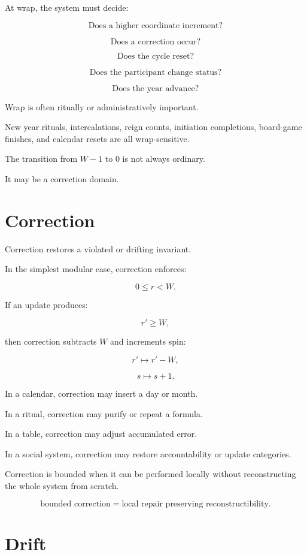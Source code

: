 \documentclass[11pt]{book}
\begin{document}
At wrap, the system must decide:

\[
\text{Does a higher coordinate increment?}
\]

\[
\text{Does a correction occur?}
\]

\[
\text{Does the cycle reset?}
\]

\[
\text{Does the participant change status?}
\]

\[
\text{Does the year advance?}
\]

Wrap is often ritually or administratively important.

New year rituals, intercalations, reign counts, initiation completions, board-game finishes, and calendar resets are all wrap-sensitive.

The transition from \(W-1\) to \(0\) is not always ordinary.

It may be a correction domain.

\section{Correction}

Correction restores a violated or drifting invariant.

In the simplest modular case, correction enforces:

\[
0 \leq r < W.
\]

If an update produces:

\[
r' \geq W,
\]

then correction subtracts \(W\) and increments spin:

\[
r' \mapsto r'-W,
\]

\[
s \mapsto s+1.
\]

In a calendar, correction may insert a day or month.

In a ritual, correction may purify or repeat a formula.

In a table, correction may adjust accumulated error.

In a social system, correction may restore accountability or update categories.

Correction is bounded when it can be performed locally without reconstructing the whole system from scratch.

\[
\text{bounded correction} = \text{local repair preserving reconstructibility}.
\]

\section{Drift}
\end{document}
